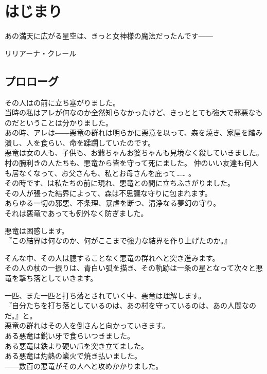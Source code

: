 \documentclass[oneside, a4paper]{jsbook}
\begin{document}
\chapter{はじまり}
\epigraph{あの満天に広がる星空は、きっと女神様の魔法だったんです――}{リリアーナ・クレール}

\section{プロローグ}

その人はの前に立ち塞がりました。\\

当時の私はアレが何なのか全然知らなかったけど、きっととても強大で邪悪なものだということは分かりました。\\
あの時、アレは――悪竜の群れは明らかに悪意を以って、森を焼き、家屋を踏み潰し、人を食らい、命を蹂躙していたのです。\\
悪竜は女の人も、子供も、お爺ちゃんお婆ちゃんも見境なく殺していきました。
村の腕利きの人たちも、悪竜から皆を守って死にました。
仲のいい友達も何人も居なくなって、お父さんも、私とお母さんを庇って…… 。\\


その時です、は私たちの前に現れ、悪竜との間に立ちふさがりました。\\
その人が張った結界によって、森は不思議な守りに包まれます。\\
あらゆる一切の邪悪、不条理、暴虐を断つ、清浄なる夢幻の守り。\\
それは悪竜であっても例外なく防ぎました。

悪竜は困惑します。\\
『この結界は何なのか、何がここまで強力な結界を作り上げたのか。』

そんな中、その人は臆することなく悪竜の群れへと突き進みます。\\
その人の杖の一振りは、青白い弧を描き、その軌跡は一条の星となって次々と悪竜を撃ち落としていきます。

一匹、また一匹と打ち落とされていく中、悪竜は理解します。\\
『自分たちを打ち落としているのは、あの村を守っているのは、あの人間なのだ。』と。\\


悪竜の群れはその人を倒さんと向かっていきます。\\
ある悪竜は鋭い牙で食らいつきました。\\
ある悪竜は鉄より硬い爪を突き立てました。\\
ある悪竜は灼熱の業火で焼き払いました。\\
――数百の悪竜がその人へと攻めかかりました。\\
\end{document}
